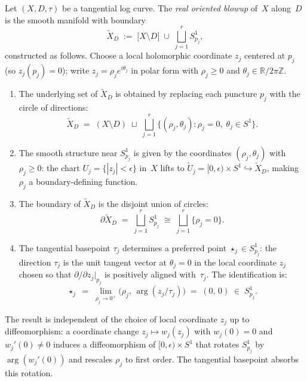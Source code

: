 \begin{construction}
\label{constr:real-oriented-blowup}
Let $(X, D, \tau)$ be a tangential log curve.  The
\emph{real oriented blowup} of~$X$ along~$D$ is the smooth
manifold with boundary
\begin{equation}\label{eq:real-oriented-blowup}
\widetilde{X}_D
\;:=\;
\bigl[X \setminus D\bigr]
\;\cup\;
\bigsqcup_{j=1}^{r} S^1_{p_j},
\end{equation}
constructed as follows.  Choose a local holomorphic coordinate
$z_j$ centered at $p_j$ (so $z_j(p_j) = 0$); write
$z_j = \rho_j e^{i\theta_j}$ in polar form with
$\rho_j \geq 0$ and $\theta_j \in \mathbb{R} / 2\pi\mathbb{Z}$.
\begin{enumerate}[label=\textup{(\arabic*)}]
\item The underlying set of $\widetilde{X}_D$ is obtained by
  replacing each puncture $p_j$ with the circle of directions:
  \[
  \widetilde{X}_D
  \;=\;
  (X \setminus D)
  \;\sqcup\;
  \bigsqcup_{j=1}^{r}
  \bigl\{(\rho_j, \theta_j) : \rho_j = 0,\;
  \theta_j \in S^1\bigr\}.
  \]
\item The smooth structure near
  $S^1_{p_j}$ is given by the coordinates
  $(\rho_j, \theta_j)$ with $\rho_j \geq 0$: the chart
  $U_j = \{|z_j| < \epsilon\}$ in~$X$ lifts to
  $\widetilde{U}_j = [0, \epsilon) \times S^1 \hookrightarrow
  \widetilde{X}_D$, making $\rho_j$ a boundary-defining function.
\item The boundary of $\widetilde{X}_D$ is the disjoint union of
  circles:
  \begin{equation}\label{eq:boundary-circles}
  \partial \widetilde{X}_D
  \;=\;
  \bigsqcup_{j=1}^{r} S^1_{p_j}
  \;\cong\;
  \bigsqcup_{j=1}^{r}
  \bigl\{\rho_j = 0\bigr\}.
  \end{equation}
\item The tangential basepoint $\tau_j$ determines a preferred
  point $\star_j \in S^1_{p_j}$: the direction $\tau_j$ is the
  unit tangent vector at $\theta_j = 0$ in the local coordinate
  $z_j$ chosen so that $\partial/\partial z_j|_{p_j}$ is
  positively aligned with~$\tau_j$.  The identification is:
  \begin{equation}\label{eq:basepoint-identification}
  \star_j
  \;=\;
  \lim_{\rho_j \to 0^+}
  \bigl(\rho_j,\, \arg(z_j / \tau_j)\bigr)
  \;=\;
  (0,\, 0)
  \;\in\;
  S^1_{p_j}.
  \end{equation}
\end{enumerate}
The result is independent of the choice of local coordinate $z_j$
up to diffeomorphism: a coordinate change $z_j \mapsto w_j(z_j)$
with $w_j(0) = 0$ and $w_j'(0) \neq 0$ induces a diffeomorphism
of $[0, \epsilon) \times S^1$ that rotates $S^1_{p_j}$ by
$\arg(w_j'(0))$ and rescales $\rho_j$ to first order.  The
tangential basepoint absorbs this rotation.
\end{construction}

